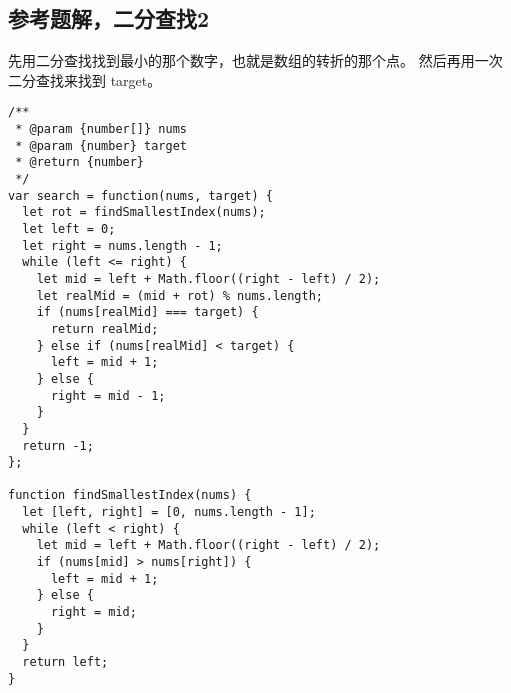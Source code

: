 \subsection{参考题解，二分查找2}

先用二分查找找到最小的那个数字，也就是数组的转折的那个点。
然后再用一次二分查找来找到 target。

\begin{verbatim}
/**
 * @param {number[]} nums
 * @param {number} target
 * @return {number}
 */
var search = function(nums, target) {
  let rot = findSmallestIndex(nums);
  let left = 0;
  let right = nums.length - 1;
  while (left <= right) {
    let mid = left + Math.floor((right - left) / 2);
    let realMid = (mid + rot) % nums.length;
    if (nums[realMid] === target) {
      return realMid;
    } else if (nums[realMid] < target) {
      left = mid + 1;
    } else {
      right = mid - 1;
    }
  }
  return -1;
};

function findSmallestIndex(nums) {
  let [left, right] = [0, nums.length - 1];
  while (left < right) {
    let mid = left + Math.floor((right - left) / 2);
    if (nums[mid] > nums[right]) {
      left = mid + 1;
    } else {
      right = mid;
    }
  }
  return left;
}
\end{verbatim}
